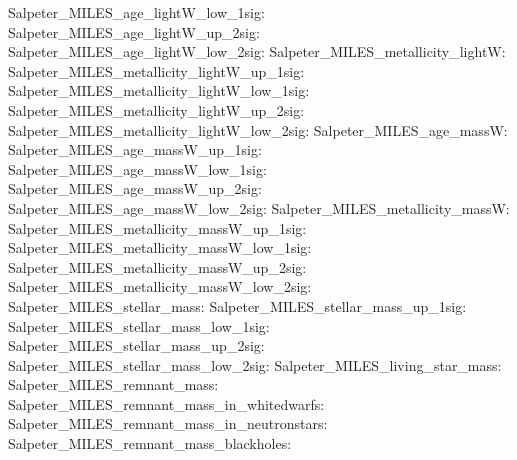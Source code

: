 Salpeter\_MILES\_age\_lightW\_low\_1sig:  \newline 
Salpeter\_MILES\_age\_lightW\_up\_2sig:  \newline 
Salpeter\_MILES\_age\_lightW\_low\_2sig:  \newline 
Salpeter\_MILES\_metallicity\_lightW:  \newline 
Salpeter\_MILES\_metallicity\_lightW\_up\_1sig:  \newline 
Salpeter\_MILES\_metallicity\_lightW\_low\_1sig:  \newline 
Salpeter\_MILES\_metallicity\_lightW\_up\_2sig:  \newline 
Salpeter\_MILES\_metallicity\_lightW\_low\_2sig:  \newline 
Salpeter\_MILES\_age\_massW:  \newline 
Salpeter\_MILES\_age\_massW\_up\_1sig:  \newline 
Salpeter\_MILES\_age\_massW\_low\_1sig:  \newline 
Salpeter\_MILES\_age\_massW\_up\_2sig:  \newline 
Salpeter\_MILES\_age\_massW\_low\_2sig:  \newline 
Salpeter\_MILES\_metallicity\_massW:  \newline 
Salpeter\_MILES\_metallicity\_massW\_up\_1sig:  \newline 
Salpeter\_MILES\_metallicity\_massW\_low\_1sig:  \newline 
Salpeter\_MILES\_metallicity\_massW\_up\_2sig:  \newline 
Salpeter\_MILES\_metallicity\_massW\_low\_2sig:  \newline 
Salpeter\_MILES\_stellar\_mass:  \newline 
Salpeter\_MILES\_stellar\_mass\_up\_1sig:  \newline 
Salpeter\_MILES\_stellar\_mass\_low\_1sig:  \newline 
Salpeter\_MILES\_stellar\_mass\_up\_2sig:  \newline 
Salpeter\_MILES\_stellar\_mass\_low\_2sig:  \newline 
Salpeter\_MILES\_living\_star\_mass:  \newline 
Salpeter\_MILES\_remnant\_mass:  \newline 
Salpeter\_MILES\_remnant\_mass\_in\_whitedwarfs:  \newline 
Salpeter\_MILES\_remnant\_mass\_in\_neutronstars:  \newline 
Salpeter\_MILES\_remnant\_mass\_blackholes:  \newline 
